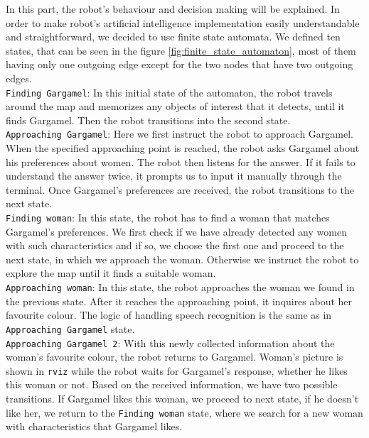 \documentclass[12pt,a4paper]{article}
\begin{document}
	In this part, the robot's behaviour and decision making will be explained. In order to make robot's artificial intelligence implementation easily understandable and straightforward, we decided to use finite state automata. We defined ten states, that can be seen in the figure \ref{fig:finite_state_automaton}, most of them having only one outgoing edge except for the two nodes that have two outgoing edges. \\

	\texttt{Finding Gargamel}: In this initial state of the automaton, the robot travels around the map and memorizes any objects of interest that it detects, until it finds Gargamel. Then the robot transitions into the second state. \\

	\texttt{Approaching Gargamel}: Here we first instruct the robot to approach Gargamel. When the specified approaching point is reached, the robot asks Gargamel about his preferences about women. The robot then listens for the answer. If it fails to understand the answer twice, it prompts us to input it manually through the terminal. Once Gargamel's preferences are received, the robot transitions to the next state. \\

	\texttt{Finding woman}: In this state, the robot has to find a woman that matches Gargamel's preferences. We first check if we have already detected any women with such characteristics and if so, we choose the first one and proceed to the next state, in which we approach the woman. Otherwise we instruct the robot to explore the map until it finds a suitable woman. \\

	\texttt{Approaching woman}: In this state, the robot approaches the woman we found in the previous state. After it reaches the approaching point, it inquires about her favourite colour. The logic of handling speech recognition is the same as in \texttt{Approaching Gargamel} state. \\

	\texttt{Approaching Gargamel 2}: With this newly collected information about the woman's favourite colour, the robot returns to Gargamel. Woman's picture is shown in \texttt{rviz} while the robot waits for Gargamel's response, whether he likes this woman or not. Based on the received information, we have two possible transitions. If Gargamel likes this woman, we proceed to next state, if he doesn't like her, we return to the \texttt{Finding woman} state, where we search for a new woman with characteristics that Gargamel likes. \\
\end{document}
